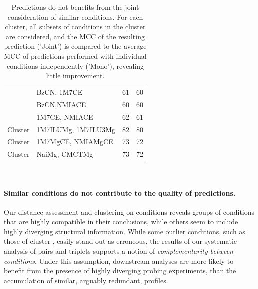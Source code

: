 \documentclass[a4,center,fleqn]{NAR}
\newcommand{\Def}[1]{{\em #1}}
\begin{document}
\begin{table}[ht]
{\begin{adjustbox}{max width=\linewidth}
\begin{tabular}{@{}llHH@{}}
				& BzCN, 1M7CE                                & 61                  & 60                      \\
				& BzCN,NMIACE                                & 60                  & 60                      \\
				& 1M7CE, NMIACE                              & 62                  & 61                      \\ \midrule
				{Cluster }                         & 1M7ILUMg, 1M7ILU3Mg                        & 82                  & 80                      \\ \midrule
				{Cluster } & 1M7MgCE, NMIAMgCE                          & 73                  & 72                      \\ \midrule
				{Cluster }                         & NaiMg, CMCTMg                              & 73                  & 72                      \\ \bottomrule
			\end{tabular}
		\end{adjustbox}
		\\}
	\caption{Predictions do not benefits from the joint consideration of similar conditions. For each cluster, all subsets of conditions in the cluster are considered, and the MCC of the resulting prediction ('Joint') is compared to the average MCC of predictions performed with individual conditions independently ('Mono'), revealing little improvement.}\label{fig:similarconds}
\end{table}

\paragraph{Similar conditions do not contribute to the quality of predictions.} 
Our distance assessment and clustering on conditions reveals groups of conditions that are highly compatible in their conclusions, while others seem to include highly diverging structural information. While some outlier conditions, such as those of cluster , easily stand out as erroneous, the results of our systematic analysis of pairs and triplets supports a notion of \Def{complementarity between conditions}. Under this assumption, downstream analyses are more likely to benefit from the presence of highly diverging probing experiments, than the accumulation of similar, arguably redundant, profiles. 
\end{document}
